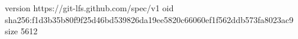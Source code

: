 version https://git-lfs.github.com/spec/v1
oid sha256:f1d3b35b80f9f25d46bd539826da19ee5820c66060ef1f562ddb573fa8023ac9
size 5612
